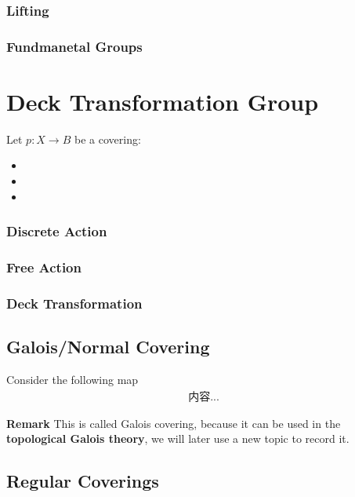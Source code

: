 \documentclass[Total.tex]{subfiles}
\begin{document}
			\subsubsection{Lifting}
			\subsubsection{Fundmanetal Groups}
			
		\section{Deck Transformation Group}
			\begin{Def}
				Let $p:X\rightarrow B$ be a covering:
				\begin{itemize}
					\item 
					\item 
					\item 
				\end{itemize}
			\end{Def}
			
			\subsubsection{Discrete Action}
			\subsubsection{Free Action}
			\subsubsection{Deck Transformation}
			\subsection{Galois/Normal Covering}
			\begin{Def}
				Consider the following map
				\begin{gather*}
					内容...
				\end{gather*}
			\end{Def}
			
			\textbf{Remark} This is called Galois covering, because it can be used in the \textbf{topological Galois theory}, we will later use a new topic to record it.
			
			\subsection{Regular Coverings}
\end{document}
